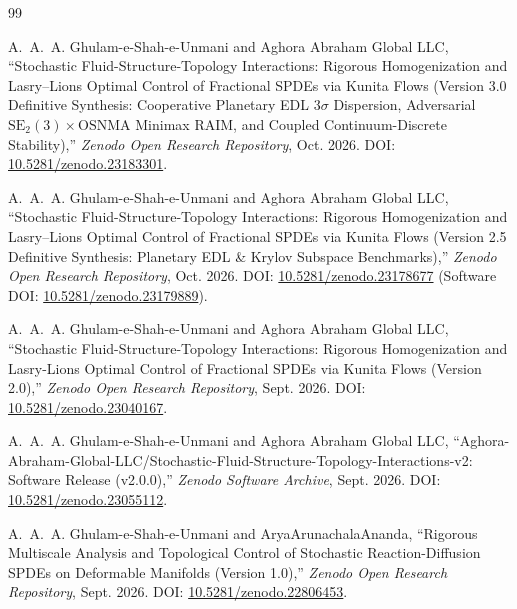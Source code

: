 \documentclass[11pt,a4paper,reqno]{article}
\theoremstyle{definition}
\theoremstyle{remark}
\begin{document}
\begin{thebibliography}{99}

A.~A.~A. Ghulam-e-Shah-e-Unmani and {Aghora Abraham Global LLC},
``Stochastic Fluid-Structure-Topology Interactions: Rigorous Homogenization and Lasry--Lions Optimal Control of Fractional SPDEs via Kunita Flows (Version 3.0 Definitive Synthesis: Cooperative Planetary EDL $3\sigma$ Dispersion, Adversarial $\mathrm{SE}_2(3) \times \mathrm{OSNMA}$ Minimax RAIM, and Coupled Continuum-Discrete Stability),''
\emph{Zenodo Open Research Repository}, Oct. 2026.
DOI: \href{https://doi.org/10.5281/zenodo.23183301}{10.5281/zenodo.23183301}.

A.~A.~A. Ghulam-e-Shah-e-Unmani and {Aghora Abraham Global LLC},
``Stochastic Fluid-Structure-Topology Interactions: Rigorous Homogenization and Lasry--Lions Optimal Control of Fractional SPDEs via Kunita Flows (Version 2.5 Definitive Synthesis: Planetary EDL \& Krylov Subspace Benchmarks),''
\emph{Zenodo Open Research Repository}, Oct. 2026.
DOI: \href{https://doi.org/10.5281/zenodo.23178677}{10.5281/zenodo.23178677} (Software DOI: \href{https://doi.org/10.5281/zenodo.23179889}{10.5281/zenodo.23179889}).

A.~A.~A. Ghulam-e-Shah-e-Unmani and {Aghora Abraham Global LLC},
``Stochastic Fluid-Structure-Topology Interactions: Rigorous Homogenization and Lasry-Lions Optimal Control of Fractional SPDEs via Kunita Flows (Version 2.0),''
\emph{Zenodo Open Research Repository}, Sept. 2026.
DOI: \href{https://doi.org/10.5281/zenodo.23040167}{10.5281/zenodo.23040167}.

A.~A.~A. Ghulam-e-Shah-e-Unmani and {Aghora Abraham Global LLC},
``Aghora-Abraham-Global-LLC/Stochastic-Fluid-Structure-Topology-Interactions-v2: Software Release (v2.0.0),''
\emph{Zenodo Software Archive}, Sept. 2026.
DOI: \href{https://doi.org/10.5281/zenodo.23055112}{10.5281/zenodo.23055112}.

A.~A.~A. Ghulam-e-Shah-e-Unmani and AryaArunachalaAnanda,
``Rigorous Multiscale Analysis and Topological Control of Stochastic Reaction-Diffusion SPDEs on Deformable Manifolds (Version 1.0),''
\emph{Zenodo Open Research Repository}, Sept. 2026.
DOI: \href{https://doi.org/10.5281/zenodo.22806453}{10.5281/zenodo.22806453}.


\end{thebibliography}
\end{document}
